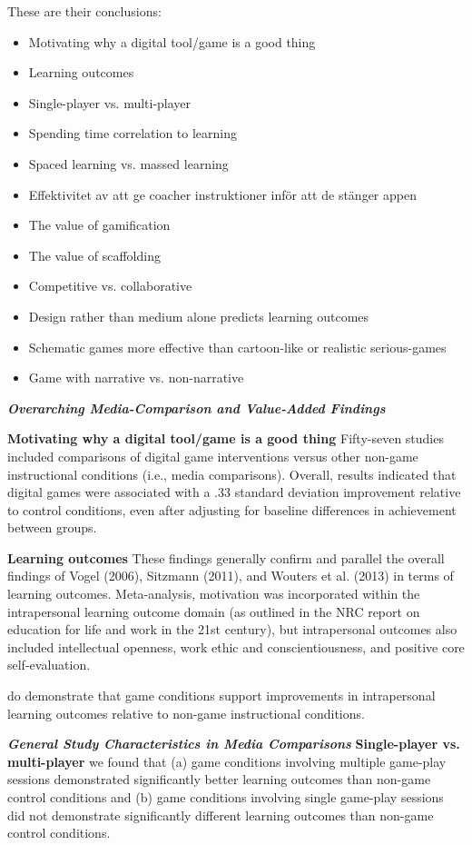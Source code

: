 These are their conclusions:
\begin{itemize}
    \item Motivating why a digital tool/game is a good thing
    \item Learning outcomes
    \item Single-player vs. multi-player
    \item Spending time correlation to learning
    \item Spaced learning vs. massed learning
    \item Effektivitet av att ge coacher instruktioner inför att de stänger appen
    \item The value of gamification
    \item The value of scaffolding
    \item Competitive vs. collaborative
    \item Design rather than medium alone predicts learning outcomes
    \item Schematic games more effective than cartoon-like or realistic serious-games
    \item Game with narrative vs. non-narrative
\end{itemize}

\textbf{\textit{Overarching Media-Comparison and Value-Added Findings}}

\textbf{Motivating why a digital tool/game is a good thing}
Fifty-seven studies included comparisons of digital game interventions versus other non-game instructional conditions (i.e., media comparisons). Overall, results indicated that digital games were associated with a .33 standard deviation improvement relative to control conditions, even after adjusting for baseline differences in achievement between groups.

\textbf{Learning outcomes}
These findings generally confirm and parallel the overall findings of Vogel (2006), Sitzmann (2011), and Wouters et al. (2013) in terms of learning outcomes. Meta-analysis, motivation was incorporated within the intrapersonal learning outcome domain (as outlined in the NRC report on education for life and work in the 21st century), but intrapersonal outcomes also included intellectual openness, work ethic and conscientiousness, and positive core self-evaluation.

do demonstrate that game conditions support improvements in intrapersonal learning outcomes relative to non-game instructional conditions.

\textbf{\textit{General Study Characteristics in Media Comparisons}}
\textbf{Single-player vs. multi-player}
we found that (a) game conditions involving multiple game-play sessions demonstrated significantly better learning outcomes than non-game control conditions and (b) game conditions involving single game-play sessions did not demonstrate significantly different learning outcomes than non-game control conditions.

